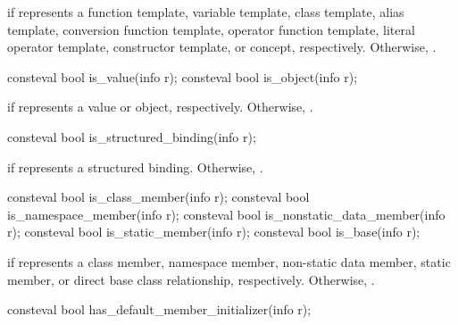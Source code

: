 \begin{itemdescr}
\pnum
\returns
{} if  represents a
function template,
variable template,
class template,
alias template,
conversion function template,
operator function template,
literal operator template,
constructor template, or
concept, respectively.
Otherwise, .
\end{itemdescr}

%
%
\begin{itemdecl}
consteval bool is_value(info r);
consteval bool is_object(info r);
\end{itemdecl}

\begin{itemdescr}
\pnum
\returns
{} if  represents a value or object, respectively.
Otherwise, .
\end{itemdescr}

%
\begin{itemdecl}
consteval bool is_structured_binding(info r);
\end{itemdecl}

\begin{itemdescr}
\pnum
\returns
{} if  represents a structured binding.
Otherwise, .
\end{itemdescr}

%
%
%
%
%
\begin{itemdecl}
consteval bool is_class_member(info r);
consteval bool is_namespace_member(info r);
consteval bool is_nonstatic_data_member(info r);
consteval bool is_static_member(info r);
consteval bool is_base(info r);
\end{itemdecl}

\begin{itemdescr}
\pnum
\returns
{} if  represents a
class member,
namespace member,
non-static data member,
static member, or
direct base class relationship, respectively.
Otherwise, .
\end{itemdescr}

%
\begin{itemdecl}
consteval bool has_default_member_initializer(info r);
\end{itemdecl}

